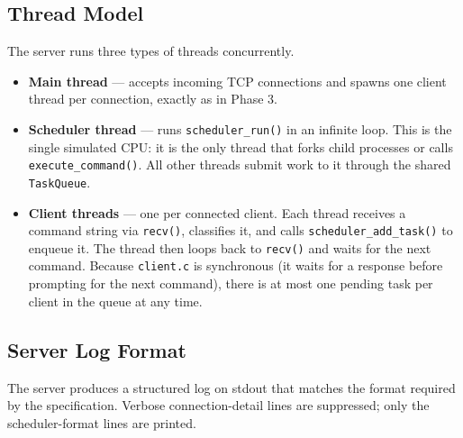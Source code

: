 \documentclass[12pt]{article}
\begin{document}
\subsection{Thread Model}

The server runs three types of threads concurrently.

\begin{itemize}
    \item \textbf{Main thread} --- accepts incoming TCP connections and spawns one
          client thread per connection, exactly as in Phase 3.
    \item \textbf{Scheduler thread} --- runs \texttt{scheduler\_run()} in an infinite
          loop. This is the single simulated CPU: it is the only thread that forks child
          processes or calls \texttt{execute\_command()}. All other threads submit work
          to it through the shared \texttt{TaskQueue}.
    \item \textbf{Client threads} --- one per connected client. Each thread receives
          a command string via \texttt{recv()}, classifies it, and calls
          \texttt{scheduler\_add\_task()} to enqueue it. The thread then loops back to
          \texttt{recv()} and waits for the next command. Because \texttt{client.c} is
          synchronous (it waits for a response before prompting for the next command),
          there is at most one pending task per client in the queue at any time.
\end{itemize}

\subsection{Server Log Format}

The server produces a structured log on stdout that matches the format required by the
specification. Verbose connection-detail lines are suppressed; only the scheduler-format
lines are printed.
\end{document}
